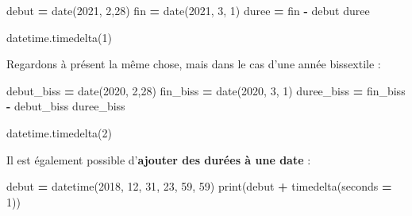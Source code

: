 \documentclass[12pt,]{book}
\newenvironment{Shaded}{\begin{snugshade}}{\end{snugshade}}
\newcommand{\DecValTok}[1]{\textcolor[rgb]{0.00,0.00,0.81}{#1}}
\newcommand{\OperatorTok}[1]{\textcolor[rgb]{0.81,0.36,0.00}{\textbf{#1}}}
\newcommand{\BuiltInTok}[1]{#1}
\newcommand{\NormalTok}[1]{#1}
\numberwithin{equation}{section}
\numberwithin{countremarque}{section}
\begin{document}
\begin{Shaded}
\begin{Highlighting}[]
\NormalTok{debut }\OperatorTok{=}\NormalTok{ date(}\DecValTok{2021}\NormalTok{, }\DecValTok{2}\NormalTok{,}\DecValTok{28}\NormalTok{)}
\NormalTok{fin }\OperatorTok{=}\NormalTok{ date(}\DecValTok{2021}\NormalTok{, }\DecValTok{3}\NormalTok{, }\DecValTok{1}\NormalTok{)}
\NormalTok{duree }\OperatorTok{=}\NormalTok{ fin }\OperatorTok{-}\NormalTok{ debut}
\NormalTok{duree}
\end{Highlighting}
\end{Shaded}

\begin{Shaded}
\begin{Highlighting}[]
\NormalTok{datetime.timedelta(}\DecValTok{1}\NormalTok{)}
\end{Highlighting}
\end{Shaded}

Regardons à présent la même chose, mais dans le cas d'une année
bissextile :

\begin{Shaded}
\begin{Highlighting}[]
\NormalTok{debut_biss }\OperatorTok{=}\NormalTok{ date(}\DecValTok{2020}\NormalTok{, }\DecValTok{2}\NormalTok{,}\DecValTok{28}\NormalTok{)}
\NormalTok{fin_biss }\OperatorTok{=}\NormalTok{ date(}\DecValTok{2020}\NormalTok{, }\DecValTok{3}\NormalTok{, }\DecValTok{1}\NormalTok{)}
\NormalTok{duree_biss }\OperatorTok{=}\NormalTok{ fin_biss }\OperatorTok{-}\NormalTok{ debut_biss}
\NormalTok{duree_biss}
\end{Highlighting}
\end{Shaded}

\begin{Shaded}
\begin{Highlighting}[]
\NormalTok{datetime.timedelta(}\DecValTok{2}\NormalTok{)}
\end{Highlighting}
\end{Shaded}

Il est également possible d'\textbf{ajouter des durées à une date} :

\begin{Shaded}
\begin{Highlighting}[]
\NormalTok{debut }\OperatorTok{=}\NormalTok{ datetime(}\DecValTok{2018}\NormalTok{, }\DecValTok{12}\NormalTok{, }\DecValTok{31}\NormalTok{, }\DecValTok{23}\NormalTok{, }\DecValTok{59}\NormalTok{, }\DecValTok{59}\NormalTok{)}
\BuiltInTok{print}\NormalTok{(debut }\OperatorTok{+}\NormalTok{ timedelta(seconds }\OperatorTok{=} \DecValTok{1}\NormalTok{))}
\end{Highlighting}
\end{Shaded}
\end{document}
